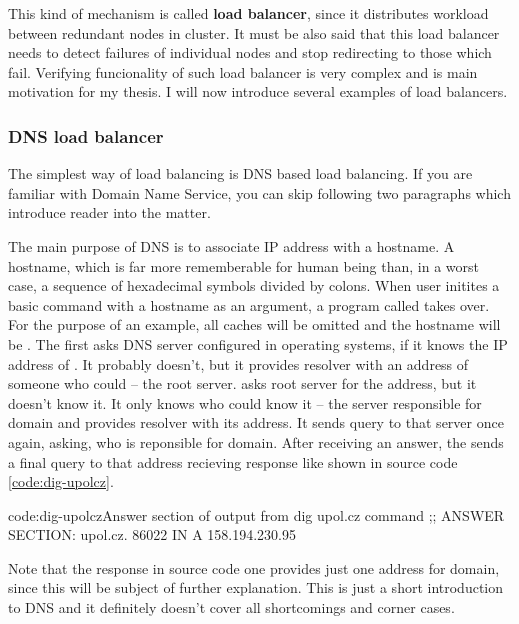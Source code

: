 \documentclass[
  master,
  biblatex,
  glossaries,
  index
]{kidiplom}
\begin{document}
This kind of mechanism is called {\bf load balancer}, since it distributes workload between redundant nodes in cluster. It must be also said that this load balancer needs to detect failures of individual nodes and stop redirecting to those which fail. Verifying funcionality of such load balancer is very complex and is main motivation for my thesis. I will now introduce several examples of load balancers.


\subsubsection{DNS load balancer}

The simplest way of load balancing is DNS based load balancing. If you are familiar with Domain Name Service, you can skip following two paragraphs which introduce reader into the matter.

The main purpose of DNS is to associate IP address with a hostname. A hostname, which is far more rememberable for human being than, in a worst case, a sequence of hexadecimal symbols divided by colons. When user initites a basic command  with a hostname as an argument, a program called  takes over. For the purpose of an example, all caches will be omitted and the hostname will be . The  first asks DNS server configured in operating systems, if it knows the IP address of . It probably doesn't, but it provides resolver with an address of someone who could -- the root server.  asks root server for the address, but it doesn't know it. It only knows who could know it -- the server responsible for  domain and provides resolver with its address. It sends query to that server once again, asking, who is reponsible for  domain. After receiving an answer, the  sends a final query to that address recieving response like shown in source code \ref{code:dig-upolcz}.

\begin{kicode}{}{code:dig-upolcz}{Answer section of output from dig upol.cz command}
;; ANSWER SECTION:
upol.cz.		86022	IN	A	158.194.230.95
\end{kicode}

Note that the response in source code one provides just one address for  domain, since this will be subject of further explanation. This is just a short introduction to DNS and it definitely doesn't cover all shortcomings and corner cases.
\end{document}

